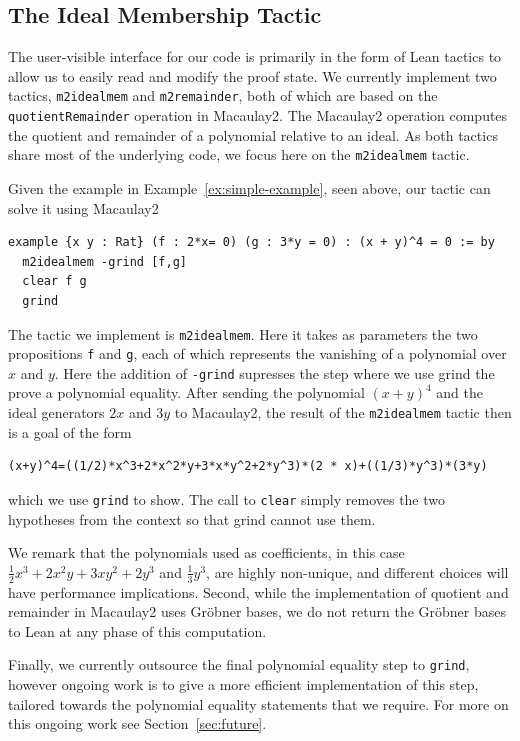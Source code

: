 \documentclass[runningheads]{llncs}
\begin{document}
\subsection*{The Ideal Membership Tactic}

The user-visible interface for our code is primarily in the form of Lean tactics to allow us to easily read and modify the proof state.
We currently implement two tactics, \verb|m2idealmem| and \verb|m2remainder|, both of which are based on the \verb|quotientRemainder| operation in Macaulay2. The Macaulay2 operation computes the quotient and remainder of a polynomial relative to an ideal. As both tactics share most of the underlying code, we focus here on the \verb|m2idealmem| tactic.



\begin{example}
Given the example in Example~\ref{ex:simple-example}, seen above, our tactic can solve it using Macaulay2
\begin{verbatim}
example {x y : Rat} (f : 2*x= 0) (g : 3*y = 0) : (x + y)^4 = 0 := by
  m2idealmem -grind [f,g]
  clear f g
  grind
\end{verbatim}

The tactic we implement is \texttt{m2idealmem}. Here it takes as parameters the two propositions \texttt{f} and \texttt{g}, each of which represents the vanishing of a polynomial over $x$ and $y$. Here the addition of \texttt{-grind} supresses the step where we use grind the prove a polynomial equality. After sending the polynomial $(x+y)^4$ and the ideal generators $2x$ and $3y$ to Macaulay2, the result of the \verb|m2idealmem| tactic then is a goal of the form
\begin{verbatim}
(x+y)^4=((1/2)*x^3+2*x^2*y+3*x*y^2+2*y^3)*(2 * x)+((1/3)*y^3)*(3*y)
\end{verbatim}
which we use \texttt{grind} to show. The call to \texttt{clear} simply removes the two hypotheses from the context so that grind cannot use them.
\end{example}

We remark that the polynomials used as coefficients, in this case $\frac{1}{2}x^3+2x^2y+3xy^2+2y^3$ and $\frac{1}{3}y^3$, are highly non-unique, and different choices will have performance implications. Second, while the implementation of quotient and remainder in Macaulay2 uses Gr\"{o}bner bases, we do not return the Gr\"{o}bner bases to Lean at any phase of this computation.

Finally, we currently outsource the final polynomial equality step to \texttt{grind}, however ongoing work is to give a more efficient implementation of this step, tailored towards the polynomial equality statements that we require. For more on this ongoing work see Section~\ref{sec:future}.
\end{document}
